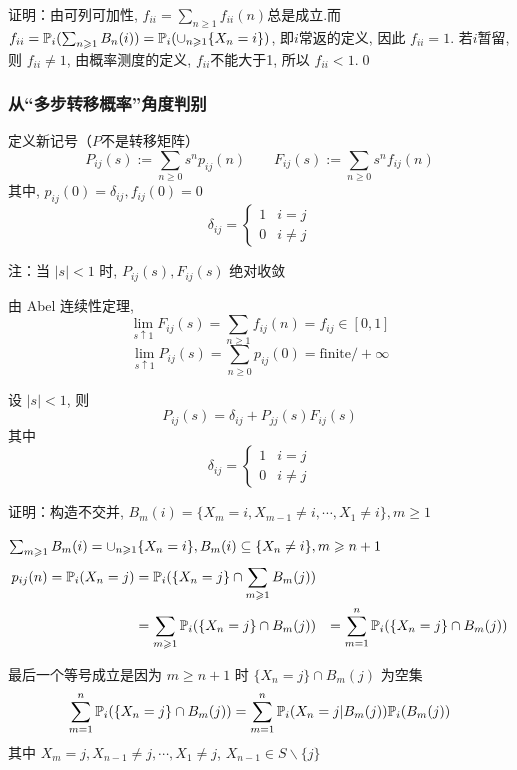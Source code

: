 证明：由可列可加性, $f_{ii}=\sum_{n\geq 1}f_{ii}(n)$总是成立.而$f_{ii}=\mathbb{P}_i(\sum_{n\geqslant 1}B_n(i))=\mathbb{P}_i(\cup_{n\geqslant 1}\{X_n=i\})$, 即$i$常返的定义, 因此 $f_{ii}=1$. 若$i$暂留, 则 $f_{ii}\neq 1$, 由概率测度的定义, $f_{ii}$不能大于1, 所以 $f_{ii}<1$.\qed

\subsubsection{从“多步转移概率”角度判别}

定义新记号（$P$不是转移矩阵）
\[
P_{ij}(s):=\sum_{n\geq 0}s^n p_{ij}(n)\qquad F_{ij}(s):=\sum_{n\geq 0}s^n f_{ij}(n)
\]
其中, $p_{ij}(0)=\delta_{ij},f_{ij}(0)=0$
\[
\delta_{ij}=\begin{cases}
    1 & i=j\\
    0 & i\neq j
\end{cases}
\]

注：当 $|s|<1$ 时, $P_{ij}(s),F_{ij}(s)$ 绝对收敛

由 Abel 连续性定理, 
\[
\lim_{s\uparrow 1}F_{ij}(s)=\sum_{n\geq 1}f_{ij}(n)=f_{ij}\in [0,1]
\]
\[
\lim_{s\uparrow 1}P_{ij}(s)=\sum_{n\geq 0}p_{ij}(0)=\text{finite}/+\infty
\]
\begin{lemma}
     设 $|s|<1$, 则
    \begin{equation}
    P_{ij}(s)=\delta_{ij}+P_{jj}(s)F_{ij}(s)
    \label{eq:genfunc}
    \end{equation}
    其中
    \[
    \delta_{ij}=\begin{cases}
        1 & i=j\\
        0 & i\neq j
    \end{cases}
    \]
\end{lemma}

证明：构造不交并, $B_m(i)=\{X_m=i,X_{m-1}\neq i,\cdots,X_1\neq i\}, m\geq 1$

$\sum_{m\geqslant 1}B_m(i)=\cup_{n\geqslant 1}\{X_n=i\}, B_m(i)\subseteq \{X_n\neq i\}, m\geqslant n+1$
\begin{equation}
\begin{aligned}
    p_{ij}(n)=\mathbb{P}_i(X_n=j)&=\mathbb{P}_i(\{X_n=j\}\cap \sum_{m\geqslant 1}B_m(j))\\
    &=\sum_{m\geqslant 1}\mathbb{P}_i(\{X_n=j\}\cap B_m(j))
    &=\sum_{m=1}^n\mathbb{P}_i(\{X_n=j\}\cap B_m(j))
\end{aligned}
\label{eq:genfunc_eq1}
\end{equation}

最后一个等号成立是因为 $m\geq n+1$ 时 $\{X_n=j\}\cap B_m(j)$ 为空集
\begin{equation}
\sum_{m=1}^n\mathbb{P}_i(\{X_n=j\}\cap B_m(j))=\sum_{m=1}^n\mathbb{P}_i(X_n=j|B_m(j))\mathbb{P}_i(B_m(j))
\label{eq:genfunc_eq2}
\end{equation}
其中 $X_m=j,X_{n-1}\neq j,\cdots,X_1\neq j$, $X_{n-1}\in S\backslash \{j\}$

